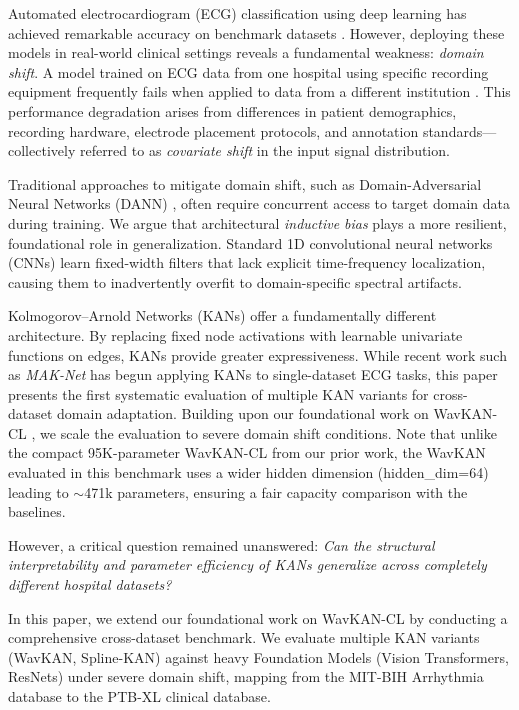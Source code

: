 \documentclass[journal,twoside,web]{ieeecolor}
\begin{document}
Automated electrocardiogram (ECG) classification using deep learning has achieved remarkable accuracy on benchmark datasets \cite{acharya2017deep, hannun2019cardiologist}. However, deploying these models in real-world clinical settings reveals a fundamental weakness: \textit{domain shift}. A model trained on ECG data from one hospital using specific recording equipment frequently fails when applied to data from a different institution \cite{strodthoff2020deep}. This performance degradation arises from differences in patient demographics, recording hardware, electrode placement protocols, and annotation standards---collectively referred to as \textit{covariate shift} in the input signal distribution.

Traditional approaches to mitigate domain shift, such as Domain-Adversarial Neural Networks (DANN) \cite{ganin2016domain}, often require concurrent access to target domain data during training. We argue that architectural \textit{inductive bias} plays a more resilient, foundational role in generalization. Standard 1D convolutional neural networks (CNNs) learn fixed-width filters that lack explicit time-frequency localization, causing them to inadvertently overfit to domain-specific spectral artifacts.

Kolmogorov--Arnold Networks (KANs) \cite{liu2024kan} offer a fundamentally different architecture. By replacing fixed node activations with learnable univariate functions on edges, KANs provide greater expressiveness. While recent work such as \textit{MAK-Net} \cite{maknet2025} has begun applying KANs to single-dataset ECG tasks, this paper presents the first systematic evaluation of multiple KAN variants for cross-dataset domain adaptation. Building upon our foundational work on WavKAN-CL \cite{manivannan2024wavkancl}, we scale the evaluation to severe domain shift conditions. Note that unlike the compact 95K-parameter WavKAN-CL from our prior work, the WavKAN evaluated in this benchmark uses a wider hidden dimension (hidden\_dim=64) leading to $\sim$471k parameters, ensuring a fair capacity comparison with the baselines.

However, a critical question remained unanswered: \textit{Can the structural interpretability and parameter efficiency of KANs generalize across completely different hospital datasets?} 

In this paper, we extend our foundational work on WavKAN-CL by conducting a comprehensive cross-dataset benchmark. We evaluate multiple KAN variants (WavKAN, Spline-KAN) against heavy Foundation Models (Vision Transformers, ResNets) under severe domain shift, mapping from the MIT-BIH Arrhythmia database to the PTB-XL clinical database.
\end{document}
